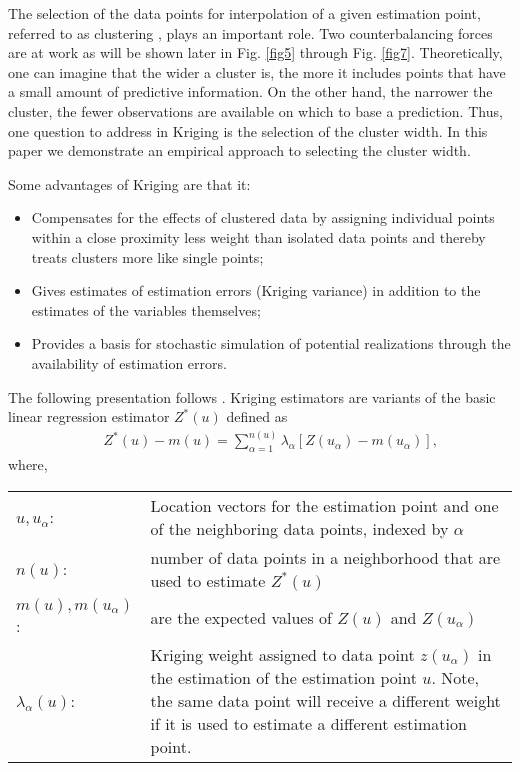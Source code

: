\documentclass[Journal]{ascelike}
\begin{document}
The selection of the data points for interpolation of a given estimation point, referred to as
clustering , plays an important role. Two counterbalancing forces are at work as will be shown
later in Fig. \ref{fig5} through Fig. \ref{fig7}. Theoretically, one can imagine that the wider a cluster
is, the more it includes points that have a small amount of predictive information. On the
other hand, the narrower the cluster, the fewer observations are available on which to base a
prediction. Thus, one question to address in Kriging is the selection of the cluster width. In
this paper we demonstrate an empirical approach to selecting the cluster width.

Some advantages of Kriging are that it:
\begin{itemize}
 \item Compensates for the effects of clustered data by assigning individual points within a
close proximity less weight than isolated data points and thereby treats clusters more like single
points;
\item Gives estimates of estimation errors (Kriging variance) in addition to the estimates of
the variables themselves;
\item Provides a basis for stochastic simulation of potential realizations through the
availability of estimation errors.
\end{itemize}
The following presentation follows . Kriging estimators are variants of the basic linear regression estimator $Z^*(u)$ defined as 
\begin{eqnarray}
&& Z^*(u)-m(u)=\sum_{\alpha=1}^{n(u)} \lambda_{\alpha} \left[ Z(u_{\alpha})-m(u_{\alpha}) \right],\label{zu}
\end{eqnarray}
where,\\
%
\begin{tabular}{lp{13cm}}
$u,u_{\alpha}$: & Location vectors for the estimation point and one of the neighboring data points, indexed by 
$\alpha$\\
$n(u)$: & number of data points in a neighborhood that are used to estimate $Z^*(u)$\\
$m(u),m(u_{\alpha})$: & are the expected values of $Z(u)$ and $Z(u_{\alpha})$\\
$\lambda_{\alpha}(u)$: & Kriging weight assigned to data point $z(u_{\alpha})$ in the estimation of the estimation 
point $u$. Note, the same data point will receive a different weight if it is used to estimate a different estimation 
point.
\end{tabular}
\end{document}
